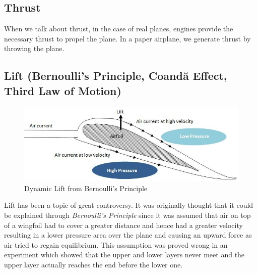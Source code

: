 \documentclass[12pt]{article}
\begin{document}
\subsection{Thrust}
When we talk about thrust, in the case of real planes, engines provide the necessary thrust to propel the plane. In a paper airplane, we generate thrust by throwing the plane.

\subsection{Lift (Bernoulli's Principle, Coandă Effect, Third Law of Motion)}
\begin{figure}[h!]
\begin{center}
\includegraphics[scale=0.4]{dynamic}
\end{center}
\caption{Dynamic Lift from Bernoulli's Principle}
\label{fig:Dynamic Lift}
\end{figure}
Lift has been a topic of great controversy. It was originally thought that it could be explained through \emph{Bernoulli's Principle} since it was assumed that air on top of a wingfoil had to cover a greater distance and hence had a greater velocity resulting in a lower pressure area over the plane and causing an upward force as air tried to regain equilibrium. This assumption was proved wrong in an experiment which showed that the upper and lower layers never meet and the upper layer actually reaches the end before the lower one.
\end{document}
